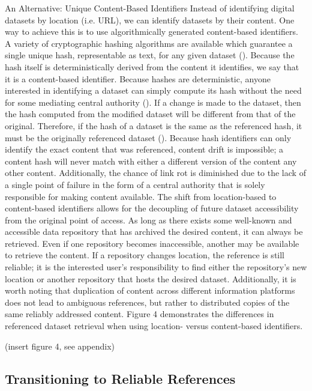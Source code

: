 \documentclass[12pt,letterpaper]{article}
\begin{document}
An Alternative: Unique Content-Based Identifiers
Instead of identifying digital datasets by location (i.e. URL), we can identify datasets by their content. One way to achieve this is to use algorithmically generated content-based identifiers. A variety of cryptographic hashing algorithms are available which guarantee a single unique hash, representable as text, for any given dataset (\cite{SHA2_2001}). Because the hash itself is deterministically derived from the content it identifies, we say that it is a content-based identifier. Because hashes are deterministic, anyone interested in identifying a dataset can simply compute its hash without the need for some mediating central authority (\cite{Paskin_1999}). If a change is made to the dataset, then the hash computed from the modified dataset will be different from that of the original. Therefore, if the hash of a dataset is the same as the referenced hash, it must be the originally referenced dataset (\cite{SHA2_2001}).
Because hash identifiers can only identify the exact content that was referenced, content drift is impossible; a content hash will never match with either a different version of the content any other content. Additionally, the chance of link rot is diminished due to the lack of a single point of failure in the form of a central authority that is solely responsible for making content available. The shift from location-based to content-based identifiers allows for the decoupling of future dataset accessibility from the original point of access. As long as there exists some well-known and accessible data repository that has archived the desired content, it can always be retrieved. Even if one repository becomes inaccessible, another may be available to retrieve the content. If a repository changes location, the reference is still reliable; it is the interested user’s responsibility to find either the repository’s new location or another repository that hosts the desired dataset. Additionally, it is worth noting that duplication of content across different information platforms does not lead to ambiguous references, but rather to distributed copies of the same reliably addressed content. Figure 4 demonstrates the differences in referenced dataset retrieval when using location- versus content-based identifiers.

% 
(insert figure 4, see appendix)

\subsection*{Transitioning to Reliable References}
\end{document}
